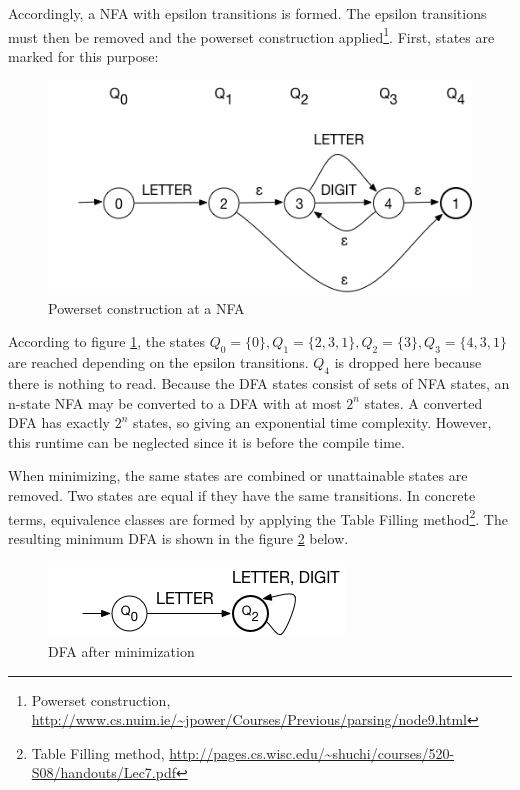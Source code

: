 Accordingly, a NFA with epsilon transitions is formed. The epsilon transitions must then be removed and the powerset construction applied\footnote{Powerset construction, \url{http://www.cs.nuim.ie/~jpower/Courses/Previous/parsing/node9.html}}. First, states are marked for this purpose:

\newpage

\begin{figure}[bth]
	\centering
	\includegraphics[scale=0.6]{./img/powerset_construction}
	\caption[Powerset construction at a NFA]{Powerset construction at a NFA}
	\label{fig:powerset_construction}
\end{figure}
\noindent

According to figure \ref{fig:powerset_construction}, the states $Q_0 = \{ 0 \}, Q_1 = \{ 2, 3, 1 \}, Q_2 = \{ 3 \}, Q_3 = \{ 4, 3, 1 \}$ are reached depending on the epsilon transitions. $Q_4$ is dropped here because there is nothing to read. Because the DFA states consist of sets of NFA states, an n-state NFA may be converted to a DFA with at most $2^n$ states. A converted DFA has exactly $2^n$ states, so giving an exponential time complexity. However, this runtime can be neglected since it is before the compile time.

When minimizing, the same states are combined or unattainable states are removed. Two states are equal if they have the same transitions. In concrete terms, equivalence classes are formed by applying the Table Filling method\footnote{Table Filling method, \url{http://pages.cs.wisc.edu/~shuchi/courses/520-S08/handouts/Lec7.pdf}}. The resulting minimum DFA is shown in the figure \ref{fig:dfa_after_minimization} below.

\begin{figure}[bth]
	\centering
	\includegraphics[scale=0.7]{./img/dfa_after_minimization}
	\caption[DFA after minimization]{DFA after minimization}
	\label{fig:dfa_after_minimization}
\end{figure}
\noindent


